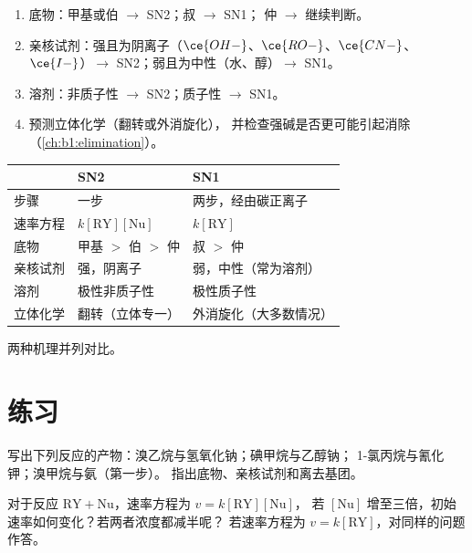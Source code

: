 \begin{method}[选择机理]\label{met:b1:nucleophilic-substitution:choose-mechanism}
\begin{enumerate}
  \item 底物：甲基或伯 $\to$ SN2；叔 $\to$ SN1；
        仲 $\to$ 继续判断。
  \item 亲核试剂：强且为阴离子（$\ce{OH-}$、$\ce{RO-}$、$\ce{CN-}$、
        $\ce{I-}$）$\to$ SN2；弱且为中性（水、醇）$\to$ SN1。
  \item 溶剂：非质子性 $\to$ SN2；质子性 $\to$ SN1。
  \item 预测立体化学（翻转或外消旋化），
        并检查强碱是否更可能引起消除
        （\cref{ch:b1:elimination}）。
\end{enumerate}
\end{method}

\begin{omfigure}
\begin{tabular}{lll}
\hline
 & SN2 & SN1 \\
\hline
步骤 & 一步 & 两步，经由碳正离子 \\
速率方程 & $k[\mathrm{RY}][\mathrm{Nu}]$ & $k[\mathrm{RY}]$ \\
底物 & 甲基 $>$ 伯 $>$ 仲 & 叔 $>$ 仲 \\
亲核试剂 & 强，阴离子 & 弱，中性（常为溶剂） \\
溶剂 & 极性非质子性 & 极性质子性 \\
立体化学 & 翻转（立体专一） & 外消旋化（大多数情况） \\
\hline
\end{tabular}

\smallskip
{\small 两种机理并列对比。}
\end{omfigure}

\section{练习}

\begin{exercise}[$\star$]\label{exo:b1:nucleophilic-substitution:1}
写出下列反应的产物：溴乙烷与氢氧化钠；碘甲烷与乙醇钠；
1-氯丙烷与氰化钾；溴甲烷与氨（第一步）。
指出底物、亲核试剂和离去基团。
\end{exercise}

\begin{exercise}[$\star$]\label{exo:b1:nucleophilic-substitution:2}
对于反应 $\mathrm{RY} + \mathrm{Nu}$，速率方程为 $v = k[\mathrm{RY}][\mathrm{Nu}]$，
若 $[\mathrm{Nu}]$ 增至三倍，初始速率如何变化？若两者浓度都减半呢？
若速率方程为 $v = k[\mathrm{RY}]$，对同样的问题作答。
\end{exercise}

